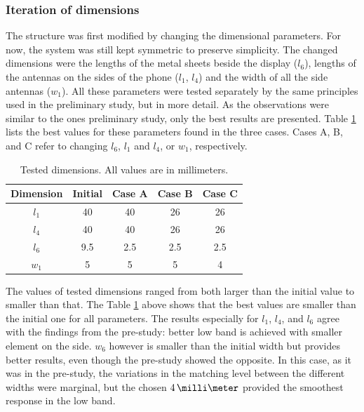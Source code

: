 \subsubsection{Iteration of dimensions}
\label{sec:dimension iteration}
The structure was first modified by changing the dimensional parameters. For now, the system was still kept symmetric to preserve simplicity. The changed dimensions were the lengths of the metal sheets beside the display ($l_6$), lengths of the antennas on the sides of the phone ($l_1$, $l_4$) and the width of all the side antennas ($w_1$).  All these parameters were tested separately by the same principles used in the preliminary study, but in more detail. As the observations were similar to the ones preliminary study, only the best results are presented. Table \ref{tab:concept2} lists the best values for these parameters found in the three cases. Cases A, B, and C refer to changing $l_6$, $l_1$ and $l_4$, or $w_1$, respectively. 
\begin{table}[H]
    \centering
    \caption{Tested dimensions. All values are in millimeters.}
    \label{tab:concept2}
    \begin{tabular}{|c|c|c|c|c|}
        \hline
        \textbf{Dimension} & \textbf{Initial} & \textbf{Case A} & \textbf{Case B} & \textbf{Case C}\\
        \hline
        $l_1$ & 40 & 40 & 26 & 26\\
        \hline
        $l_4$ & 40 & 40 & 26 & 26\\
        \hline
        $l_6$ & 9.5 & 2.5 & 2.5 & 2.5\\
        \hline
        $w_1$ & 5 & 5 & 5 & 4\\
        \hline
    \end{tabular}
\end{table}

The values of tested dimensions ranged from both larger than the initial value to smaller than that. The Table \ref{tab:concept2} above shows that the best values are smaller than the initial one for all parameters. The results especially for $l_1$, $l_4$, and $l_6$ agree with the findings from the pre-study: better low band is achieved with smaller element on the side. $w_6$ however is smaller than the initial width but provides better results, even though the pre-study showed the opposite. In this case, as it was in the pre-study, the variations in the matching level between the different widths were marginal, but the chosen $4\,\milli\meter$ provided the smoothest response in the low band.

